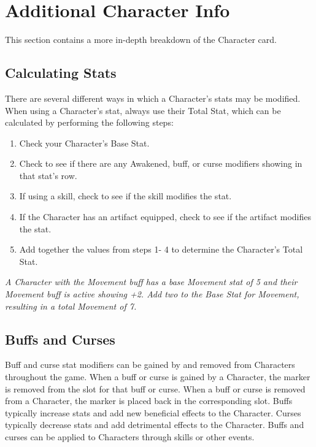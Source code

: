 \documentclass[../main.tex]{subfiles}
\begin{document}
\section{Additional Character Info}
This section contains a more in-depth breakdown of the Character card.

\subsection{Calculating Stats}
There are several different ways in which a Character’s stats may be modified. When using a Character’s stat, always use their Total Stat, which can be calculated by performing the following steps:

\begin{enumerate}
    \item Check your Character's Base Stat.
    \item Check to see if there are any Awakened, buff, or curse modifiers showing in that stat's row. 
    \item If using a skill, check to see if the skill modifies the stat. 
    \item If the Character has an artifact equipped, check to see if the artifact modifies the stat. 
    \item Add together the values from steps 1- 4 to determine the Character's Total Stat. 
\end{enumerate}

\textit{A Character with the Movement buff has a base Movement stat of 5 and their Movement buff is active showing +2. Add two to the Base Stat for Movement, resulting in a total Movement of 7.}

\subsection{Buffs and Curses}
Buff and curse stat modifiers can be gained by and removed from Characters throughout the game. When a buff or curse is gained by a Character, the marker is removed from the slot for that buff or curse. When a buff or curse is removed from a Character, the marker is placed back in the corresponding slot. Buffs typically increase stats and add new beneficial effects to the Character. Curses typically decrease stats and add detrimental effects to the Character. Buffs and curses can be applied to Characters through skills or other events. 
\end{document}
